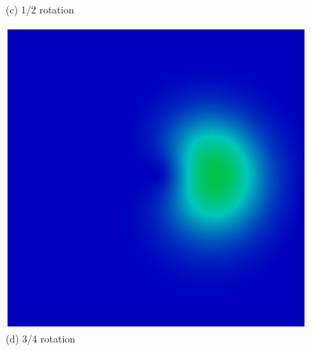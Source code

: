 \begin{figure}[H]
\begin{minipage}{.5\linewidth}
      (c) 1/2 rotation
     \end{minipage}%
     \begin{minipage}{.5\linewidth}
      \centering
      \includegraphics[scale=0.42]{./02_chaps/cap_validation/figure/figSLlinear3.png}\\
      (d) 3/4 rotation
     \end{minipage}
     \label{SL linear fig}
\end{figure}


